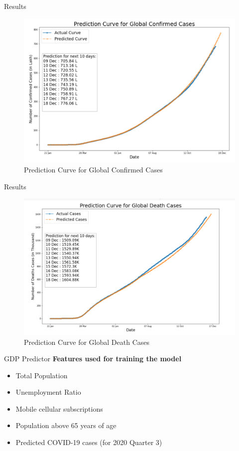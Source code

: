 \documentclass[11pt]{beamer}
\begin{document}
\begin{frame}{Results}
\begin{figure}
\includegraphics[scale=0.45]{neural_confirm_pred}
\caption{Prediction Curve for Global Confirmed Cases}
\end{figure}
\end{frame}

\begin{frame}{Results}
\begin{figure}
\includegraphics[scale=0.45]{neural_death_pred}
\caption{Prediction Curve for Global Death Cases}
\end{figure}
\end{frame}
\begin{frame}{GDP Predictor}
\textbf{Features used for training the model}
\begin{itemize}
\item Total Population
\item Unemployment Ratio
\item Mobile cellular subscriptions
\item Population above 65 years of age
\item Predicted COVID-19 cases (for 2020 Quarter 3)
\end{itemize}
\end{frame}
\end{document}
